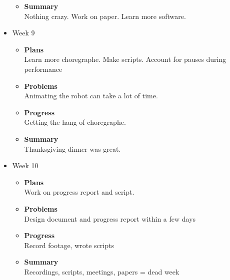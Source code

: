 \begin{itemize}
\begin{itemize}
				\item \textbf{Summary} \\
				Nothing crazy. Work on paper. Learn more software.
			\end{itemize}
		\item{Week 9}
			\begin{itemize}
				\item \textbf{Plans} \\
				Learn more choregraphe. Make scripts. Account for pauses during performance
				\item \textbf{Problems} \\
				Animating the robot can take a lot of time.
				\item \textbf{Progress} \\
				Getting the hang of choregraphe.
				\item \textbf{Summary} \\
				Thanksgiving dinner was great.
			\end{itemize}
		\item{Week 10}
			\begin{itemize}
				\item \textbf{Plans} \\
				Work on progress report and script.
				\item \textbf{Problems} \\
				Design document and progress report within a few days
				\item \textbf{Progress} \\
				Record footage, wrote scripts
				\item \textbf{Summary} \\
				Recordings, scripts, meetings, papers = dead week
			\end{itemize}
	\end{itemize}
